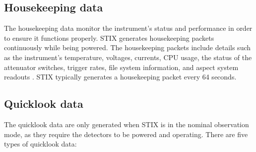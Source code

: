 \documentclass[referee]{preaa} %
\begin{document}
\subsection{Housekeeping  data}
 The housekeeping data monitor the instrument's status and performance in order to ensure it functions properly. 
 STIX generates housekeeping packets continuously while being powered.  
 The housekeeping packets include details such as the instrument's temperature, 
 voltages, currents, CPU usage, the status of the attenuator switches, 
 trigger rates, file system information, and aspect system readouts \citep{Warmuth2020, stix2020}. STIX typically generates a  housekeeping packet every 64 seconds. %
 
\subsection{Quicklook data}
The quicklook data are only generated when STIX is in the nominal observation mode, as they require the detectors to be powered and operating. There are five types of quicklook data:
\end{document}
